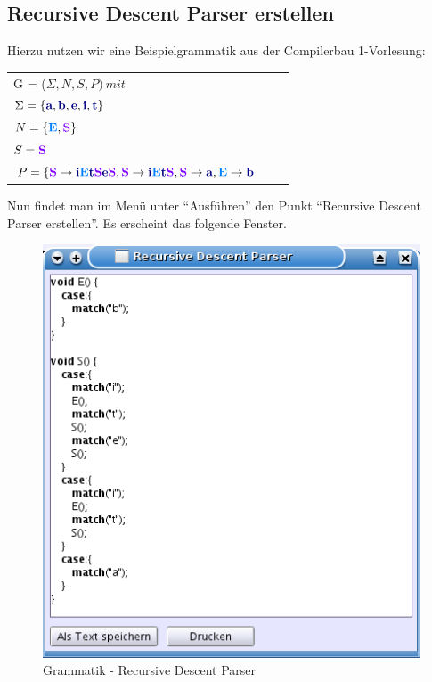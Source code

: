 \subsection{Recursive Descent Parser erstellen}

Hierzu nutzen wir eine Beispielgrammatik aus der Compilerbau 1-Vorlesung:

\begin{tabular}{lcr}
G = ($\Sigma, N, S, P )\ mit $\\
$\Sigma = \{\TerminalSymbol{a}, \TerminalSymbol{b}, \TerminalSymbol{e},
\TerminalSymbol{i},\TerminalSymbol{t}\}$\\ $N =
\{\NonterminalSymbol{E}, \StartSymbol{S}\}$\\ $S=\StartSymbol{S}$\\
$P = \{\StartSymbol{S} \to \TerminalSymbol{i}\NonterminalSymbol{E}\TerminalSymbol{t}\StartSymbol{S}\TerminalSymbol{e}\StartSymbol{S},\StartSymbol{S} \to \TerminalSymbol{i}\NonterminalSymbol{E}\TerminalSymbol{t}\StartSymbol{S}, \StartSymbol{S} \to \TerminalSymbol{a}, \NonterminalSymbol{E} \to \TerminalSymbol{b}$\\
\end{tabular}

Nun findet man im Menü unter "`Ausführen"' den Punkt "`Recursive Descent Parser erstellen"'. Es erscheint das folgende Fenster.

\begin{figure}[h]
\begin{center}
\includegraphics[width=12cm]{../images/rdp.png}
\caption{Grammatik - Recursive Descent Parser}
\end{center}
\end{figure}


